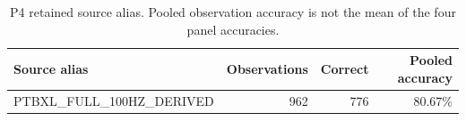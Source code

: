 \begin{table}[tbp]
\caption{P4 retained source alias. Pooled observation accuracy is not the mean of the four panel accuracies.\label{tab:app_source_primary4}}
\centering\small
\begin{tabular}{lrrr}
\toprule
Source alias & Observations & Correct & Pooled accuracy \\
\midrule
PTBXL\_FULL\_100HZ\_DERIVED & 962 & 776 & 80.67\% \\
\bottomrule
\end{tabular}
\end{table}